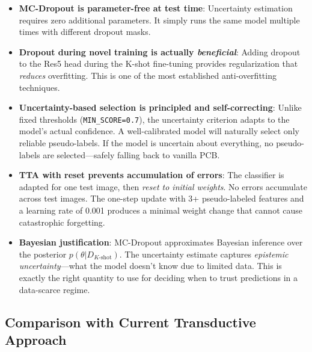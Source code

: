 \documentclass[11pt,a4paper]{article}
\begin{document}
\begin{itemize}[nosep]
    \item \textbf{MC-Dropout is parameter-free at test time}: Uncertainty estimation requires zero additional parameters. It simply runs the same model multiple times with different dropout masks.
    \item \textbf{Dropout during novel training is actually \textit{beneficial}}: Adding dropout to the Res5 head during the K-shot fine-tuning provides regularization that \textit{reduces} overfitting. This is one of the most established anti-overfitting techniques.
    \item \textbf{Uncertainty-based selection is principled and self-correcting}: Unlike fixed thresholds (\texttt{MIN\_SCORE=0.7}), the uncertainty criterion adapts to the model's actual confidence. A well-calibrated model will naturally select only reliable pseudo-labels. If the model is uncertain about everything, no pseudo-labels are selected---safely falling back to vanilla PCB.
    \item \textbf{TTA with reset prevents accumulation of errors}: The classifier is adapted for one test image, then \textit{reset to initial weights}. No errors accumulate across test images. The one-step update with 3+ pseudo-labeled features and a learning rate of 0.001 produces a minimal weight change that cannot cause catastrophic forgetting.
    \item \textbf{Bayesian justification}: MC-Dropout approximates Bayesian inference over the posterior $p(\theta|D_{K\text{-shot}})$. The uncertainty estimate captures \textit{epistemic uncertainty}---what the model doesn't know due to limited data. This is exactly the right quantity to use for deciding when to trust predictions in a data-scarce regime.
\end{itemize}

\subsection{Comparison with Current Transductive Approach}
\end{document}
